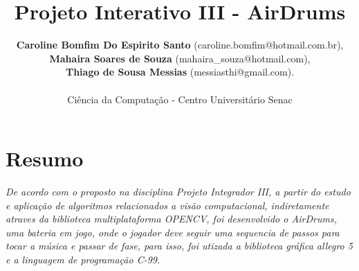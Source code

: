 \documentclass[12pt,openright,oneside,a4paper,brazil]{abntex2}
\title{Projeto Interativo III - AirDrums}
\date{}
\author{\textbf{Caroline Bomfim Do Espirito Santo} (caroline.bomfim@hotmail.com.br), \\ \textbf{Mahaira Soares de Souza} (mahaira\_souza@hotmail.com), \\ \textbf{Thiago de Sousa Messias} (messiasthi@gmail.com). \\ \\ Ciência da Computação - Centro Universitário Senac}
\begin{document}
\maketitle
 
\section*{Resumo}

\textit{De acordo com o proposto na disciplina Projeto Integrador III, a partir do estudo e aplicação de algoritmos relacionados a visão computacional, indiretamente atraves da biblioteca multiplataforma OPENCV, foi desenvolvido o AirDrums, uma bateria em jogo, onde o jogador deve seguir uma sequencia de passos para tocar a música e passar de fase, para isso, foi utizada a biblioteca gráfica allegro 5 e a linguagem de programação C-99.}\\
\end{document}
